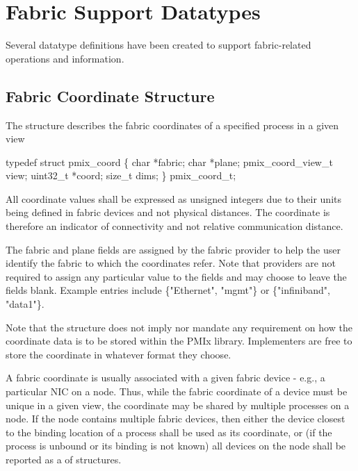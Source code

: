 \section{Fabric Support Datatypes}

Several datatype definitions have been created to support fabric-related operations and information.

\subsection{Fabric Coordinate Structure}

The  structure describes the fabric coordinates of a specified process in a given view

\cspecificstart
\begin{codepar}
typedef struct pmix_coord \{
    char *fabric;
    char *plane;
    pmix_coord_view_t view;
    uint32_t *coord;
    size_t dims;
\} pmix_coord_t;
\end{codepar}
\cspecificend

All coordinate values shall be expressed as unsigned integers due to their units being defined in fabric devices and not physical distances. The coordinate is therefore an indicator of connectivity and not relative communication distance.

The fabric and plane fields are assigned by the fabric provider to help the user identify the fabric to which the coordinates refer. Note that providers are not required to assign any particular value to the fields and may choose to leave the fields blank. Example entries include \{"Ethernet", "mgmt"\} or \{"infiniband", "data1"\}.

\adviceimplstart
Note that the  structure does not imply nor mandate any requirement on how the coordinate data is to be stored within the \ac{PMIx} library. Implementers are free to store the coordinate in whatever format they choose.
\adviceimplend

A fabric coordinate is usually associated with a given fabric device - e.g., a particular \ac{NIC} on a node. Thus, while the fabric coordinate of a device must be unique in a given view, the coordinate may be shared by multiple processes on a node. If the node contains multiple fabric devices, then either the device closest to the binding location of a process shall be used as its coordinate, or (if the process is unbound or its binding is not known) all devices on the node shall be reported as a  of  structures.

